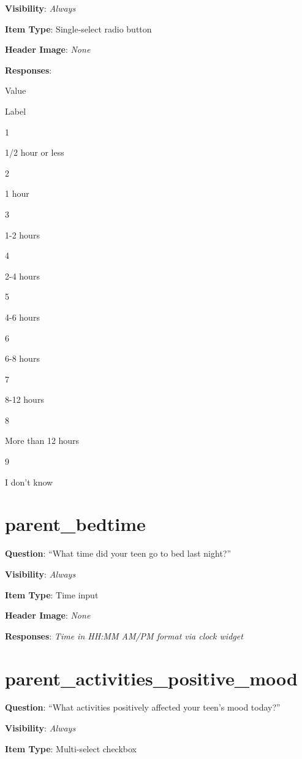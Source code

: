 \documentclass[]{book}
\begin{document}
\textbf{Visibility}: \emph{Always}

\textbf{Item Type}: Single-select radio button

\textbf{Header Image}: \emph{None}

\textbf{Responses}:

Value

Label

1

1/2 hour or less

2

1 hour

3

1-2 hours

4

2-4 hours

5

4-6 hours

6

6-8 hours

7

8-12 hours

8

More than 12 hours

9

I don't know

\hypertarget{parent_bedtime}{%
\section{parent\_bedtime}\label{parent_bedtime}}

\textbf{Question}: ``What time did your teen go to bed last night?''

\textbf{Visibility}: \emph{Always}

\textbf{Item Type}: Time input

\textbf{Header Image}: \emph{None}

\textbf{Responses}: \emph{Time in HH:MM AM/PM format via clock widget}

\hypertarget{parent_activities_positive_mood}{%
\section{parent\_activities\_positive\_mood}\label{parent_activities_positive_mood}}

\textbf{Question}: ``What activities positively affected your teen's mood today?''

\textbf{Visibility}: \emph{Always}

\textbf{Item Type}: Multi-select checkbox
\end{document}
